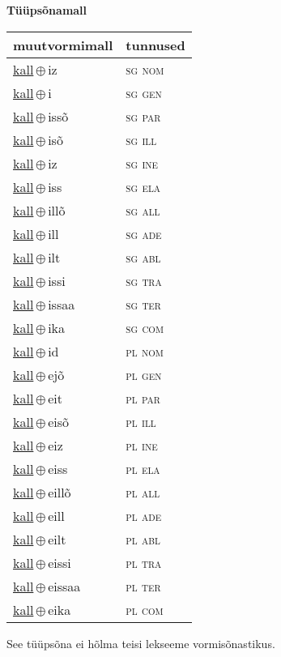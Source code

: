 

\vspace{3.5em}
\noindent \begin{minipage}{\textwidth}
\noindent \textbf{Tüüpsõnamall \,}\\

\begin{sideways}
\begin{tabular}{l l}
muutvormimall & tunnused \\
\hline
\underline{kall}\,$\oplus$\,iz & \textsc{ sg nom } \\
\underline{kall}\,$\oplus$\,i & \textsc{ sg gen } \\
\underline{kall}\,$\oplus$\,issõ & \textsc{ sg par } \\
\underline{kall}\,$\oplus$\,isõ & \textsc{ sg ill } \\
\underline{kall}\,$\oplus$\,iz & \textsc{ sg ine } \\
\underline{kall}\,$\oplus$\,iss & \textsc{ sg ela } \\
\underline{kall}\,$\oplus$\,illõ & \textsc{ sg all } \\
\underline{kall}\,$\oplus$\,ill & \textsc{ sg ade } \\
\underline{kall}\,$\oplus$\,ilt & \textsc{ sg abl } \\
\underline{kall}\,$\oplus$\,issi & \textsc{ sg tra } \\
\underline{kall}\,$\oplus$\,issaa & \textsc{ sg ter } \\
\underline{kall}\,$\oplus$\,ika & \textsc{ sg com } \\
\underline{kall}\,$\oplus$\,id & \textsc{ pl nom } \\
\underline{kall}\,$\oplus$\,ejõ & \textsc{ pl gen } \\
\underline{kall}\,$\oplus$\,eit & \textsc{ pl par } \\
\underline{kall}\,$\oplus$\,eisõ & \textsc{ pl ill } \\
\underline{kall}\,$\oplus$\,eiz & \textsc{ pl ine } \\
\underline{kall}\,$\oplus$\,eiss & \textsc{ pl ela } \\
\underline{kall}\,$\oplus$\,eillõ & \textsc{ pl all } \\
\underline{kall}\,$\oplus$\,eill & \textsc{ pl ade } \\
\underline{kall}\,$\oplus$\,eilt & \textsc{ pl abl } \\
\underline{kall}\,$\oplus$\,eissi & \textsc{ pl tra } \\
\underline{kall}\,$\oplus$\,eissaa & \textsc{ pl ter } \\
\underline{kall}\,$\oplus$\,eika & \textsc{ pl com } \\
\end{tabular}
\end{sideways}
\label{tab:tüüpsõnamall-kalliz}

\end{minipage}

 
\vspace{1em}
\noindent See tüüpsõna ei hõlma teisi lekseeme vormi\-sõnastikus.
